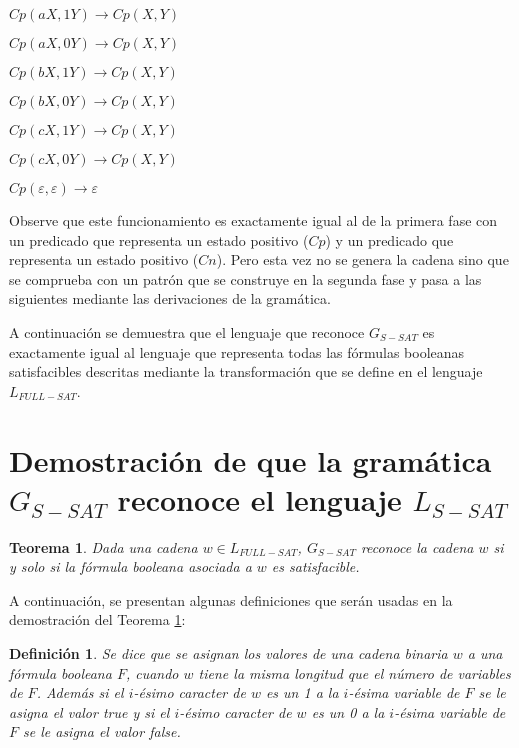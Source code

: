 \documentclass[12pt]{article}
\newtheorem{theorem}{Teorema}
\newtheorem{definition}{Definición}
\newcommand{\true}{\textit{true}}
\newcommand{\false}{\textit{false}}
\begin{document}
\begin{itemize}
\begin{enumerate}[start=23]
\begin{multicols}{2}
                  \item $Cp(aX,1Y) \to Cp(X,Y)$
                  \item $Cp(aX,0Y) \to Cp(X,Y)$
                  \item $Cp(bX,1Y) \to Cp(X,Y)$
                  \item $Cp(bX,0Y) \to Cp(X,Y)$
                  \item $Cp(cX,1Y) \to Cp(X,Y)$
                  \item $Cp(cX,0Y) \to Cp(X,Y)$
                  \item $Cp(\varepsilon,\varepsilon)\to \varepsilon$
              \end{multicols}
          \end{enumerate}
          
          Observe que este funcionamiento es exactamente igual al de la primera fase con un predicado que representa un estado positivo ($Cp$) y un predicado que representa un estado positivo ($Cn$). Pero esta vez no se genera la cadena sino que se comprueba con un patrón que se construye en la segunda fase y pasa a las siguientes mediante las derivaciones de la gramática.
          
\end{itemize}

A continuación se demuestra que el lenguaje que reconoce $G_{S-SAT}$ es exactamente igual al lenguaje que
representa todas las fórmulas booleanas satisfacibles descritas mediante la transformación que se define
en el lenguaje $L_{FULL-SAT}$.

\section{Demostración de que la gramática $G_{S-SAT}$ reconoce el lenguaje $L_{S-SAT}$}

\begin{theorem}
    \label{teo:gsat}
    Dada una cadena $w\in L_{FULL-SAT}$, $G_{S-SAT}$ reconoce la cadena $w$ si y solo si la fórmula booleana asociada a
    $w$ es satisfacible. 
\end{theorem}

A continuación, se presentan algunas definiciones que serán usadas en la demostración del Teorema \ref{teo:gsat}:

\begin{definition}
    Se dice que se asignan los valores de una cadena binaria $w$ a una fórmula booleana $F$, cuando $w$ tiene la misma longitud
    que el número de variables de $F$. Además si el $i$-ésimo caracter de $w$ es un 1 a la $i$-ésima variable de $F$ se le asigna
    el valor \true{} y si el $i$-ésimo caracter de $w$ es un 0 a la $i$-ésima variable de $F$ se le asigna
    el valor \false{}.
\end{definition}
\end{document}
